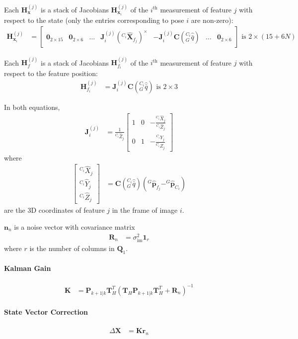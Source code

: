 \documentclass[10pt,letterpaper,fleqn,oneside]{article}
\newcommand{\nl}{\\[0.5em]}
\def\Vec#1{\mathbf{#1}} %
\newcommand{\bbm}{\begin{bmatrix}}
\newcommand{\ebm}{\end{bmatrix}}
\begin{document}
Each $\Vec{H}^{(j)}_\Vec{x}$ is a stack of Jacobians $\Vec{H}^{(j)}_{\Vec{x}_i}$ of the $i^\text{th}$ measurement of feature $j$ with respect to the state (only the entries corresponding to pose $i$ are non-zero):
\begin{align}
\Vec{H}^{(j)}_{\Vec{x}_i} &= \bbm \Vec{0}_{2\times15} & \Vec{0}_{2\times6} & \hdots & \Vec{J}^{\left(j\right)}_i \left(^{C_i}\hat{\Vec{X}}_{f_j}\right)^\times & -\Vec{J}^{\left(j\right)}_i \Vec{C}\left(^{C_i}_G\hat{\bar{q}}\right) & \hdots & \Vec{0}_{2\times6} \ebm \text{ is } 2\times\left(15 + 6N\right)
\end{align}

Each $\Vec{H}^{(j)}_f$ is a stack of Jacobians $\Vec{H}^{(j)}_{f_i}$ of the $i^\text{th}$ measurement of feature $j$ with respect to the feature position:
\begin{align}
\Vec{H}^{(j)}_{f_i} &= \Vec{J}^{\left(j\right)}_i \Vec{C}\left(^{C_i}_G\hat{\bar{q}}\right) \text{ is } 2\times3
\end{align}

In both equations,
\begin{align}
\Vec{J}^{\left(j\right)}_i &= \frac{1}{^{C_i}\hat{Z}_j}
\bbm 1 & 0 & -\frac{^{C_i}\hat{X}_j}{^{C_i}\hat{Z}_j} \nl
		 0 & 1 & -\frac{^{C_i}\hat{Y}_j}{^{C_i}\hat{Z}_j}
\ebm
\end{align}
where 
\begin{align}
\bbm ^{C_i}\hat{X}_j \nl ^{C_i}\hat{Y}_j \nl ^{C_i}\hat{Z}_j \ebm &= \Vec{C}\left(^{C_i}_G\hat{\bar{q}}\right) \left(^G\hat{\Vec{p}}_{f_j} - ^G\hat{\Vec{p}}_{C_i} \right)
\end{align}
are the 3D coordinates of feature $j$ in the frame of image $i$.

$\Vec{n}_n$ is a noise vector with covariance matrix
\begin{align}
\Vec{R}_n &= \sigma^2_{\text{im}} \Vec{1}_r
\end{align}
where $r$ is the number of columns in $\Vec{Q}_1$.
\newpage
\paragraph{Kalman Gain}
\begin{align}
\Vec{K} &= \Vec{P}_{k+1|k}\Vec{T}_H^T\left(\Vec{T}_H\Vec{P}_{k+1|k}\Vec{T}_H^T + \Vec{R}_n \right)^{-1}
\end{align}

\paragraph{State Vector Correction}
\begin{align}
\Delta\Vec{X} &= \Vec{K}\Vec{r}_n
\end{align}
\end{document}
